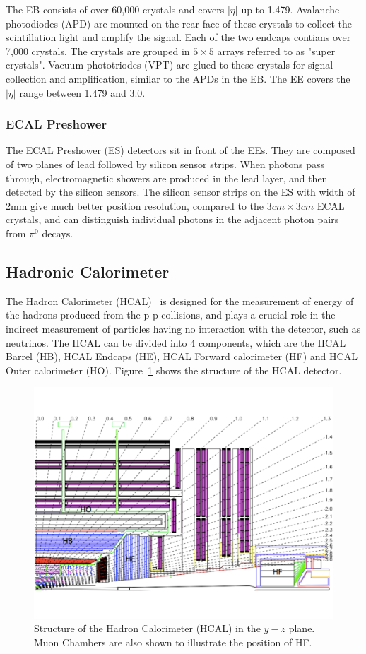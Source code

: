 \vspace{0.3cm}
The EB consists of over 60,000 crystals and covers $|\eta|$ up to 1.479. Avalanche photodiodes (APD) are mounted on the rear face of these crystals to collect the scintillation light and amplify the signal. Each of the two endcaps contians over 7,000 crystals. The crystals are grouped in $5\times 5$ arrays referred to as "super crystals". Vacuum phototriodes (VPT) are glued to these crystals for signal collection and amplification, similar to the APDs in the EB. The EE covers the $|\eta|$ range between 1.479 and 3.0. 

\subsubsection{ECAL Preshower}
The ECAL Preshower (ES) detectors sit in front of the EEs. They are composed of two planes of lead followed by silicon sensor strips. When photons pass through, electromagnetic showers are produced in the lead layer, and then detected by the silicon sensors. The silicon sensor strips on the ES with width of 2mm give much better position resolution, compared to the $3cm\times 3cm$ ECAL crystals, and can distinguish individual photons in the adjacent photon pairs from $\pi^{0}$ decays.

\subsection{Hadronic Calorimeter} 
The Hadron Calorimeter (HCAL)~\cite{lhc_hcaldesign} is designed for the measurement of energy of the hadrons produced from the p-p collisions, and plays a crucial role in the indirect measurement of particles having no interaction with the detector, such as neutrinos. The HCAL can be divided into 4 components, which are the HCAL Barrel (HB), HCAL Endcaps (HE), HCAL Forward calorimeter (HF) and HCAL Outer calorimeter (HO). Figure~\ref{fig:lhc_hcaldesign} shows the structure of the HCAL detector.
\begin{figure}[htbp]
\begin{center}
\includegraphics[width=0.7\linewidth]{figures/lhc_hcaldesign.pdf}
\caption{Structure of the Hadron Calorimeter (HCAL) in the $y-z$ plane. Muon Chambers are also shown to illustrate the position of HF.}
\label{fig:lhc_hcaldesign}
\end{center}
\end{figure}


